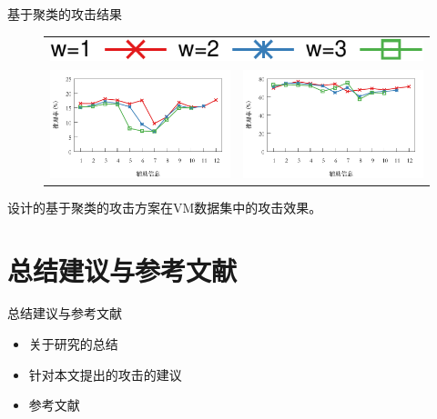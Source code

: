 \documentclass[aspectratio=43]{beamer}
\begin{document}
\begin{frame}{基于聚类的攻击结果}
\begin{figure}[H]
    \centering
    \begin{tabular}{p{.48\linewidth}p{.48\linewidth}}
        \multicolumn{2}{c}{\includegraphics[width=.35\textwidth]{img/clu-effect-bar.pdf}}  \\
        \includegraphics[width=\linewidth]{img/clu-effect-rate.pdf} &
        \includegraphics[width=\linewidth]{img/clu-effect-pre.pdf}\\
    \end{tabular}
\end{figure}
\begin{card}
设计的基于聚类的攻击方案在VM数据集中的攻击效果。
\end{card}  
\end{frame}

\section{总结建议与参考文献}
\begin{frame}{总结建议与参考文献}
\begin{card}
\begin{itemize}
    \item 关于研究的总结
    \item 针对本文提出的攻击的建议
    \item 参考文献
\end{itemize}
\end{card}
\end{frame}
\end{document}
